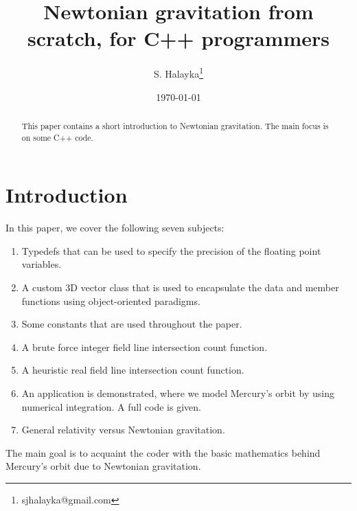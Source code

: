 \documentclass[12pt]{article}
\title{Newtonian gravitation from scratch, for C++ programmers}
\author{S. Halayka\footnote{sjhalayka@gmail.com}}
\date{\today\;\currenttime}
\begin{document}
 
\maketitle

\begin{abstract}
This paper contains a short introduction to Newtonian gravitation.
The main focus is on some C++ code.
\end{abstract}




\section{Introduction}

In this paper, we cover the following seven subjects:
\begin{enumerate}
\item Typedefs that can be used to specify the precision of the floating point variables.
\item A custom 3D vector class that is used to encapsulate the data and member functions using object-oriented paradigms.
\item Some constants that are used throughout the paper.
\item A brute force integer field line intersection count function.
\item A heuristic real field line intersection count function.
\item An application is demonstrated, where we model Mercury's orbit by using numerical integration.
A full code is given.
\item General relativity versus Newtonian gravitation.
\end{enumerate}

The main goal is to acquaint the coder with the basic mathematics behind Mercury's orbit due to Newtonian gravitation.
\end{document}
